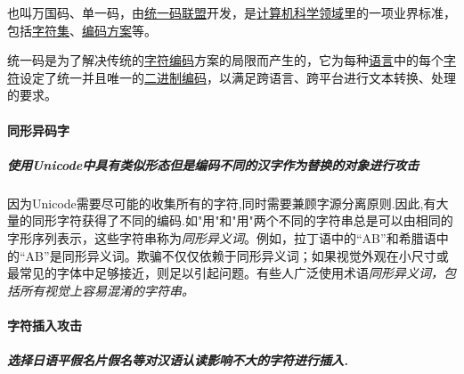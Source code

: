 \documentclass[
]{article}
\begin{document}
也叫万国码、单一码，由\href{https://baike.baidu.com/item/统一码联盟/3694574?fromModule=lemma_inlink}{统一码联盟}开发，是\href{https://baike.baidu.com/item/计算机科学领域/12650606?fromModule=lemma_inlink}{计算机科学领域}里的一项业界标准，包括\href{https://baike.baidu.com/item/字符集/946585?fromModule=lemma_inlink}{字符集}、\href{https://baike.baidu.com/item/编码方案/20835369?fromModule=lemma_inlink}{编码方案}等。

统一码是为了解决传统的\href{https://baike.baidu.com/item/字符编码/8446880?fromModule=lemma_inlink}{字符编码}方案的局限而产生的，它为每种\href{https://baike.baidu.com/item/语言/72744?fromModule=lemma_inlink}{语言}中的每个\href{https://baike.baidu.com/item/字符/4768913?fromModule=lemma_inlink}{字符}设定了统一并且唯一的\href{https://baike.baidu.com/item/二进制编码/1758517?fromModule=lemma_inlink}{二进制编码}，以满足跨语言、跨平台进行文本转换、处理的要求。

\hypertarget{ux540cux5f62ux5f02ux7801ux5b57}{%
\paragraph{同形异码字}\label{ux540cux5f62ux5f02ux7801ux5b57}}

\hypertarget{ux4f7fux7528unicodeux4e2dux5177ux6709ux7c7bux4f3cux5f62ux6001ux4f46ux662fux7f16ux7801ux4e0dux540cux7684ux6c49ux5b57ux4f5cux4e3aux66ffux6362ux7684ux5bf9ux8c61ux8fdbux884cux653bux51fb}{%
\subparagraph{使用Unicode中具有类似形态但是编码不同的汉字作为替换的对象进行攻击}\label{ux4f7fux7528unicodeux4e2dux5177ux6709ux7c7bux4f3cux5f62ux6001ux4f46ux662fux7f16ux7801ux4e0dux540cux7684ux6c49ux5b57ux4f5cux4e3aux66ffux6362ux7684ux5bf9ux8c61ux8fdbux884cux653bux51fb}}

因为Unicode需要尽可能的收集所有的字符,同时需要兼顾字源分离原则.因此,有大量的同形字符获得了不同的编码.如"用"和"用"两个不同的字符串总是可以由相同的字形序列表示，这些字符串称为\emph{同形异义词}。例如，拉丁语中的``AB''和希腊语中的``AB''是同形异义词。欺骗不仅仅依赖于同形异义词；如果视觉外观在小尺寸或最常见的字体中足够接近，则足以引起问题。有些人广泛使用术语\emph{同形异义词，包括所有视觉上容易混淆的字符串。}

\hypertarget{ux5b57ux7b26ux63d2ux5165ux653bux51fb}{%
\paragraph{字符插入攻击}\label{ux5b57ux7b26ux63d2ux5165ux653bux51fb}}

\hypertarget{ux9009ux62e9ux65e5ux8bedux5e73ux5047ux540dux7247ux5047ux540dux7b49ux5bf9ux6c49ux8bedux8ba4ux8bfbux5f71ux54cdux4e0dux5927ux7684ux5b57ux7b26ux8fdbux884cux63d2ux5165}{%
\subparagraph{选择日语平假名片假名等对汉语认读影响不大的字符进行插入.}\label{ux9009ux62e9ux65e5ux8bedux5e73ux5047ux540dux7247ux5047ux540dux7b49ux5bf9ux6c49ux8bedux8ba4ux8bfbux5f71ux54cdux4e0dux5927ux7684ux5b57ux7b26ux8fdbux884cux63d2ux5165}}
\end{document}
